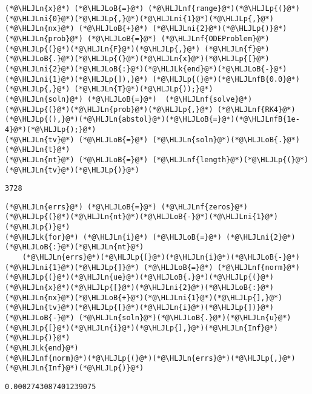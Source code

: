\documentclass[12pt,landscape]{article}
\newcommand{\HLJLk}[1]{\textcolor[RGB]{148,91,176}{\textbf{#1}}}
\newcommand{\HLJLn}[1]{#1}
\newcommand{\HLJLnf}[1]{\textcolor[RGB]{66,102,213}{#1}}
\newcommand{\HLJLnfB}[1]{\textcolor[RGB]{59,151,46}{#1}}
\newcommand{\HLJLni}[1]{\textcolor[RGB]{59,151,46}{#1}}
\newcommand{\HLJLoB}[1]{\textcolor[RGB]{102,102,102}{\textbf{#1}}}
\newcommand{\HLJLp}[1]{#1}
\begin{document}
{\begin{lstlisting}
(*@\HLJLn{x}@*) (*@\HLJLoB{=}@*) (*@\HLJLnf{range}@*)(*@\HLJLp{(}@*)(*@\HLJLni{0}@*)(*@\HLJLp{,}@*)(*@\HLJLni{1}@*)(*@\HLJLp{,}@*)(*@\HLJLn{nx}@*) (*@\HLJLoB{+}@*) (*@\HLJLni{2}@*)(*@\HLJLp{)}@*)
(*@\HLJLn{prob}@*) (*@\HLJLoB{=}@*) (*@\HLJLnf{ODEProblem}@*)(*@\HLJLp{(}@*)(*@\HLJLn{F}@*)(*@\HLJLp{,}@*) (*@\HLJLn{f}@*)(*@\HLJLoB{.}@*)(*@\HLJLp{(}@*)(*@\HLJLn{x}@*)(*@\HLJLp{[}@*)(*@\HLJLni{2}@*)(*@\HLJLoB{:}@*)(*@\HLJLk{end}@*)(*@\HLJLoB{-}@*)(*@\HLJLni{1}@*)(*@\HLJLp{]),}@*) (*@\HLJLp{(}@*)(*@\HLJLnfB{0.0}@*)(*@\HLJLp{,}@*) (*@\HLJLn{T}@*)(*@\HLJLp{));}@*)
(*@\HLJLn{soln}@*) (*@\HLJLoB{=}@*)  (*@\HLJLnf{solve}@*)(*@\HLJLp{(}@*)(*@\HLJLn{prob}@*)(*@\HLJLp{,}@*) (*@\HLJLnf{RK4}@*)(*@\HLJLp{(),}@*)(*@\HLJLn{abstol}@*)(*@\HLJLoB{=}@*)(*@\HLJLnfB{1e-4}@*)(*@\HLJLp{);}@*)
(*@\HLJLn{tv}@*) (*@\HLJLoB{=}@*) (*@\HLJLn{soln}@*)(*@\HLJLoB{.}@*)(*@\HLJLn{t}@*)
(*@\HLJLn{nt}@*) (*@\HLJLoB{=}@*) (*@\HLJLnf{length}@*)(*@\HLJLp{(}@*)(*@\HLJLn{tv}@*)(*@\HLJLp{)}@*)
\end{lstlisting}

\begin{lstlisting}
3728
\end{lstlisting}


\begin{lstlisting}
(*@\HLJLn{errs}@*) (*@\HLJLoB{=}@*) (*@\HLJLnf{zeros}@*)(*@\HLJLp{(}@*)(*@\HLJLn{nt}@*)(*@\HLJLoB{-}@*)(*@\HLJLni{1}@*)(*@\HLJLp{)}@*)
(*@\HLJLk{for}@*) (*@\HLJLn{i}@*) (*@\HLJLoB{=}@*) (*@\HLJLni{2}@*)(*@\HLJLoB{:}@*)(*@\HLJLn{nt}@*)
    (*@\HLJLn{errs}@*)(*@\HLJLp{[}@*)(*@\HLJLn{i}@*)(*@\HLJLoB{-}@*)(*@\HLJLni{1}@*)(*@\HLJLp{]}@*) (*@\HLJLoB{=}@*) (*@\HLJLnf{norm}@*)(*@\HLJLp{(}@*)(*@\HLJLn{ue}@*)(*@\HLJLoB{.}@*)(*@\HLJLp{(}@*)(*@\HLJLn{x}@*)(*@\HLJLp{[}@*)(*@\HLJLni{2}@*)(*@\HLJLoB{:}@*)(*@\HLJLn{nx}@*)(*@\HLJLoB{+}@*)(*@\HLJLni{1}@*)(*@\HLJLp{],}@*)(*@\HLJLn{tv}@*)(*@\HLJLp{[}@*)(*@\HLJLn{i}@*)(*@\HLJLp{])}@*) (*@\HLJLoB{-}@*) (*@\HLJLn{soln}@*)(*@\HLJLoB{.}@*)(*@\HLJLn{u}@*)(*@\HLJLp{[}@*)(*@\HLJLn{i}@*)(*@\HLJLp{],}@*)(*@\HLJLn{Inf}@*)(*@\HLJLp{)}@*)
(*@\HLJLk{end}@*)
(*@\HLJLnf{norm}@*)(*@\HLJLp{(}@*)(*@\HLJLn{errs}@*)(*@\HLJLp{,}@*)(*@\HLJLn{Inf}@*)(*@\HLJLp{)}@*)
\end{lstlisting}

\begin{lstlisting}
0.0002743087401239075
\end{lstlisting}


}
\end{document}
